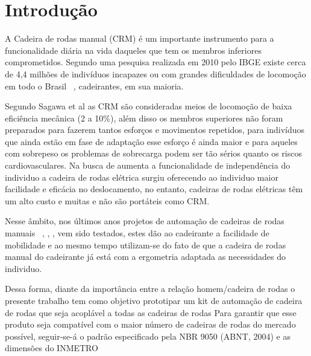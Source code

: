 \chapter[Introdução]{Introdução}

A Cadeira de rodas manual (CRM) é um importante instrumento para a funcionalidade diária na vida daqueles que tem os membros inferiores comprometidos. Segundo uma pesquisa realizada em 2010 pelo IBGE existe cerca de 4,4 milhões de indivíduos incapazes ou com grandes dificuldades de locomoção em todo o Brasil ~\cite{ibge:cartilha:2010}, cadeirantes, em sua maioria.

Segundo Sagawa et al  as CRM são consideradas meios de locomoção de baixa eficiência mecânica (2 a 10\%), além disso os membros superiores não foram preparados para fazerem tantos esforços e movimentos repetidos,  para indivíduos que ainda estão em fase de adaptação esse esforço é ainda maior e para aqueles com sobrepeso os problemas de sobrecarga podem ser tão sérios quanto os riscos cardiovasculares.
Na busca de aumenta a funcionalidade de independência do individuo a cadeira de rodas elétrica surgiu oferecendo ao individuo maior facilidade e eficácia no deslocamento, no entanto, cadeiras de rodas elétricas têm um alto custo e muitas e não são portáteis como CRM.

Nesse âmbito, nos últimos anos projetos de automação de cadeiras de rodas manuais ~\cite{brunel:wheelchair:2004}, \cite{artigo_rudi}, \cite{patent_cadeira_rodas_eletrica},	 \cite{marcos:controle:2002}  vem sido testados, estes dão ao cadeirante a facilidade de mobilidade  e ao mesmo tempo utilizam-se do fato de que a cadeira de rodas manual do cadeirante já está com a ergometria  adaptada as necessidades do individuo.

Dessa forma, diante da importância entre a relação homem/cadeira de rodas o presente trabalho tem como objetivo prototipar um kit de automação de cadeira de rodas que seja acoplável a todas as cadeiras de rodas  Para garantir que esse produto seja compatível com o maior número de cadeiras de rodas do mercado possível, seguir-se-á o padrão especificado pela NBR 9050 (ABNT, 2004) e as dimensões do INMETRO~\cite{inmetro}
